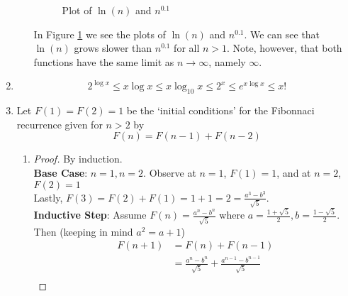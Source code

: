 \documentclass{article}
\begin{document}
\begin{enumerate}
\begin{enumerate}[label=\arabic*.]
\begin{figure}
                        \caption{Plot of $\ln(n)$ and $n^{0.1}$}
                        \label{fig:inftyPlot}
                    \end{figure}
                    In Figure \ref{fig:inftyPlot} we see the plots of \(\ln(n)\) and \(n^{0.1}\). We can see that \(\ln(n)\) grows slower than \(n^{0.1}\) for all \(n > 1\). Note, however, that both functions have the same limit as \(n \to \infty\), namely \(\infty\).
          \end{enumerate}
          \pagebreak
    \item \begin{equation*}
              2^{\log x} \leq x \log x \leq x \log_{10} x \leq 2^x \leq e^{x \log x} \leq x!
          \end{equation*}
    \item Let \(F(1) = F(2) = 1\) be the `initial conditions' for the Fibonnaci recurrence given for \(n > 2\) by
          \begin{equation*}
              F(n) = F(n-1) + F(n-2)
          \end{equation*}
          \begin{enumerate}[label=\arabic*.]
              \item \begin{proof}
                        By induction. \\
                        \textbf{Base Case}: \(n = 1, n = 2\).
                        Observe at \(n = 1\), \(F(1) = 1\), and at \(n = 2\), \(F(2) = 1\) \\
                        Lastly, \(F(3) = F(2) + F(1) = 1 + 1 = 2 = \frac{a^3 - b^3}{\sqrt{5}}\). \\
                        \textbf{Inductive Step}: Assume \(F(n) = \frac{a^n - b^n}{\sqrt{5}}\) where \(a = \frac{1 + \sqrt{5}}{2}, b = \frac{1 - \sqrt{5}}{2}\). \\
                        Then (keeping in mind \(a^2 = a + 1\)) \begin{align*}
                            F(n+1) & = F(n) + F(n-1)                                                   \\
                                   & = \frac{a^n - b^n}{\sqrt{5}} + \frac{a^{n-1} - b^{n-1}}{\sqrt{5}} \\

\end{align*}
\end{proof}
\end{enumerate}
\end{enumerate}
\end{document}
